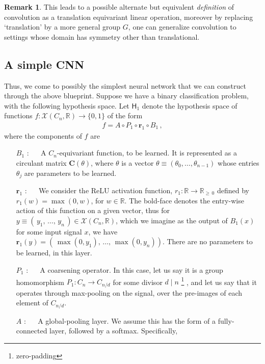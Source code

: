 \documentclass[12pt]{article}
\numberwithin{equation}{section}
\theoremstyle{definition}
\newtheorem{rmk}[thm]{Remark}
\newcommand{		\R		}	{	\mathbb{R}				}
\newcommand{		\cX		}	{	\mathcal{X}				}
\newcommand{		\eq		}[1]	{	\begin{align*}#1\end{align*}	}%
\newcommand{		\1		}	{	\bm{1}					}%
\begin{document}
\begin{rmk}
This leads to a possible alternate but equivalent \emph{definition} of convolution as a translation equivariant linear operation, moreover by replacing `translation' by a more general group $G$, one can generalize convolution to settings whose domain has symmetry other than translational. 
\end{rmk} 


\subsection{A simple CNN}

Thus, we come to possibly the simplest neural network that we can construct through the above blueprint. Suppose we have a binary classification problem, with the following hypothesis space. Let $\textsf{H}_1$ denote the hypothesis space of functions $f : \mathcal{X}( C_n, \R) \to \{0,1\}$ of the form 
\eq{
f = A \circ P_1 \circ \bm{r}_1 \circ B_1 \,,
}
where the components of $f$ are 
\begin{itemize}

\item [ $B_1$ ] : $\quad$ A $C_n$-equivariant function, to be learned. It is represented as a circulant matrix $\bm{C}(\theta)$, where $\theta$ is a vector $\theta \equiv (\theta_0, \dots, \theta_{n-1})$ whose entries $\theta_j$ are parameters to be learned. 

\item[ $ \bm{r}_1 $ ] : $\quad$ We consider the ReLU activation function, $r_1 : \mathbb{R} \to \mathbb{R}_{\geq\, 0}$ defined by $r_1(w) = \max(0,w)$, for $w \in \mathbb{R}$. The bold-face denotes the entry-wise action of this function on a given vector, thus for $y \equiv (\,y_1, \,\dots, \, y_n \, ) \in \cX(C_n, \R)$, which we imagine as the output of $B_1(x)$ for some input signal $x$, we have $\bm{r}_1 (y ) = ( \,  \max(0,y_1), \,  \dots, \, \max(0,y_n) )$. There are no parameters to be learned, in this layer. 

\item [ $P_1$ ] : $\quad$ A coarsening operator. In this case, let us say it is a group homomorphism $P_1 : C_n \to C_{n / d }$ for some divisor $d \mid n$ \footnote{zero-padding} , and let us say that it operates through max-pooling on the signal, over the pre-images of each element of $C_{n / d}$. 

\item[ $A$ ] : $\quad$ A global-pooling layer. We assume this has the form of a fully-connected layer, followed by a softmax. Specifically,

\subitem 

\subitem  

\end{itemize}
\end{document}

